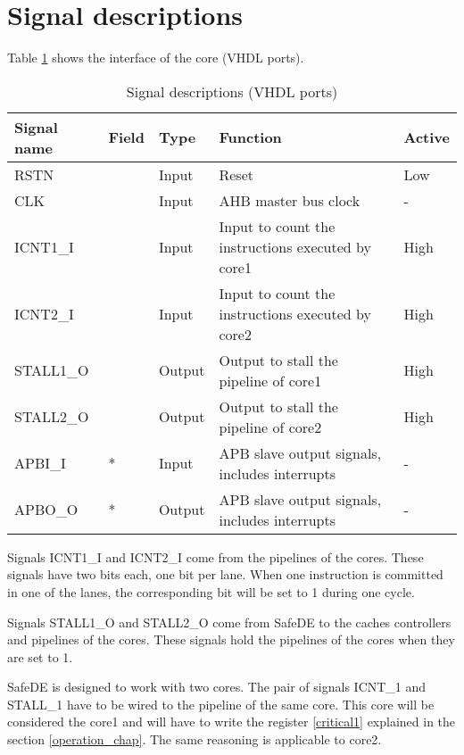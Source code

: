 \section{Signal descriptions}

Table \ref{t_ports} shows the interface of the core (VHDL ports).
\begin{table}[H]
	\caption{Signal descriptions (VHDL ports)}
	\label{t_ports}
	\centering
	\begin{footnotesize}
	\begin{tabular}{|l|l|l|p{6cm}|l|}
		\hline
		\textbf{Signal name} & \textbf{Field}  & \textbf{Type}  & \textbf{Function} & \textbf{Active}\\
		\hline
		RSTN & &Input &Reset & Low\\
		\hline
		CLK & &Input &AHB master bus clock & -\\
		\hline
		ICNT1\_I & &Input & Input to count the instructions executed by core1 & High\\
		\hline
		ICNT2\_I & &Input & Input to count the instructions executed by core2 & High\\
		\hline
		STALL1\_O & &Output & Output to stall the pipeline of core1 & High\\
		\hline
		STALL2\_O & &Output & Output to stall the pipeline of core2 & High\\
		\hline
		APBI\_I & * &Input &APB slave output signals, includes interrupts & - \\
		\hline
		APBO\_O & * &Output &APB slave output signals, includes interrupts & - \\
		\hline
	\end{tabular}
\end{footnotesize}
\end{table}

Signals ICNT1\_I and ICNT2\_I come from the pipelines of the cores. These signals have two bits each, one bit per lane. When one instruction is committed in one of the lanes, the corresponding bit will be set to 1 during one cycle.

Signals STALL1\_O and STALL2\_O come from SafeDE to the caches controllers and pipelines of the cores. These signals hold the pipelines of the cores when they are set to 1.

SafeDE is designed to work with two cores. The pair of signals ICNT\_1 and STALL\_1 have to be wired to the pipeline of the same core. This core will be considered the core1 and will have to write the register \ref{critical1} explained in the section \ref{operation_chap}. The same reasoning is applicable to core2.


\hspace{2cm}



